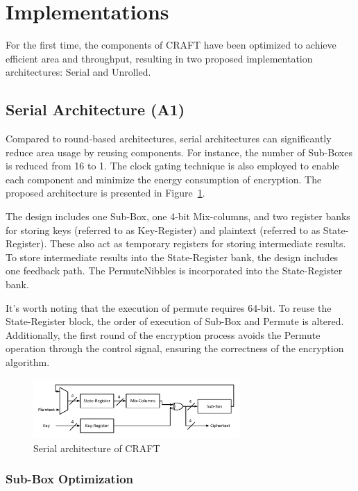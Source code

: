 \documentclass[final,5p,times,twocolumn]{elsarticle}
\begin{document}
\section{Implementations}\label{sec3}

For the first time, the components of CRAFT have been optimized to achieve efficient area and throughput, resulting in two proposed implementation architectures: Serial and Unrolled.


\subsection{Serial Architecture (A1)}\label{subsec2}
Compared to round-based architectures, serial architectures can significantly reduce area usage by reusing components. For instance, the number of Sub-Boxes is reduced from 16 to 1. The clock gating technique is also employed to enable each component and minimize the energy consumption of encryption. The proposed architecture is presented in Figure~\ref{fig3}.

The design includes one Sub-Box, one 4-bit Mix-columns, and two register banks for storing keys (referred to as Key-Register) and plaintext (referred to as State-Register). These also act as temporary registers for storing intermediate results. To store intermediate results into the State-Register bank, the design includes one feedback path. The PermuteNibbles is incorporated into the State-Register bank.

It's worth noting that the execution of permute requires 64-bit. To reuse the State-Register block, the order of execution of Sub-Box and Permute is altered. Additionally, the first round of the encryption process avoids the Permute operation through the control signal, ensuring the correctness of the encryption algorithm.

\begin{figure}[h]%
    \centering
    \includegraphics[width=0.7\textwidth]{./fig/serial-archticture.pdf}
    \caption{Serial architecture of CRAFT}\label{fig3}
\end{figure}


\subsubsection{Sub-Box Optimization }\label{subsubsec1}
\end{document}
